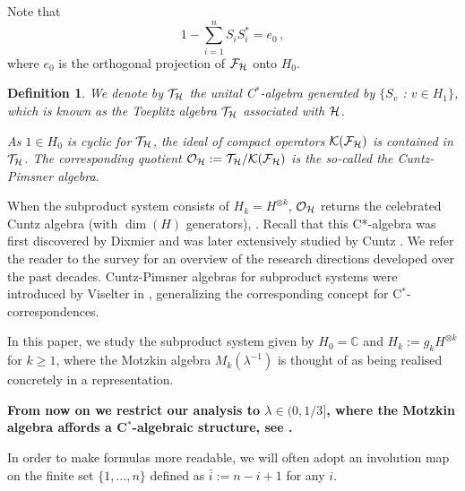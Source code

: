\documentclass[12pt, a4paper]{amsart}
\def\dim{\operatorname{dim}}
\newcommand{\IC}[0]{\mathbb{C}} \newcommand{\ID}[0]{\mathbb{D}}
\newcommand{\CK}[0]{\mathcal{K}} \newcommand{\CL}[0]{\mathcal{L}}
\newcommand{\CO}[0]{\mathcal{O}} \newcommand{\CP}[0]{\mathcal{P}}
\newtheorem{definition}[theorem]{Definition}
\numberwithin{equation}{section}
\begin{document}
Note that 
$$
1-\sum_{i=1}^n S_iS_i^* = e_0\,,
$$ 
where $e_0$ is the orthogonal projection of  $\mathcal{F}_{\mathcal{H}}$ onto $H_0$. 
\begin{definition}
We denote by $\mathcal{T}_{\mathcal{H}}$ the unital C$^*$-algebra generated by $\{S_v$ : $v\in H_1\}$, which is known as the
 Toeplitz algebra 
$\mathcal{T}_{\mathcal{H}}$
associated with $\mathcal{H}$.

As $1\in H_0$ is cyclic for $\mathcal{T}_{\mathcal{H}}$,
 the ideal of compact operators $\CK(\CF_\CH)$ is contained in  $\mathcal{T}_{\mathcal{H}}$.
The corresponding quotient 
 $\CO_\CH:=\CT_\CH/\CK(\CF_\CH)$ is the so-called  the Cuntz-Pimsner algebra.  
 \end{definition}
When the subproduct system consists of  $H_k=H^{\otimes k}$, $\CO_\CH$ returns the celebrated Cuntz algebra (with $\dim(H)$ generators), \cite{Cuntz}. 
Recall that this C*-algebra was first discovered by Dixmier and was later extensively studied by Cuntz \cite{Dixmier64,Cuntz}. We refer the reader to the survey \cite{ACRsurvey} for an overview of the research directions developed over the past decades.
Cuntz-Pimsner algebras for subproduct systems were introduced by Viselter in \cite{Viselter12}, generalizing the corresponding concept  for C$^*$-correspondences.

In this paper, we study the subproduct system given by $H_0=\IC$ and $H_k:=g_{k}H^{\otimes k}$ for $k\geq 1$, where the Motzkin algebra $M_k(\lambda^{-1})$ is thought of as being realised concretely in a representation.

\begin{center}
\textbf{From now on we restrict our analysis to $\lambda\in (0,1/3]$, where the Motzkin algebra affords a C$^*$-algebraic structure,  see \cite{Jo21}.}
\end{center}
In order to make formulas more readable, 
we will often adopt an involution map on the finite set $\{1,\ldots, n\}$ defined
as $\bar{i}:=n-i+1$ for any $i$.
\end{document}
